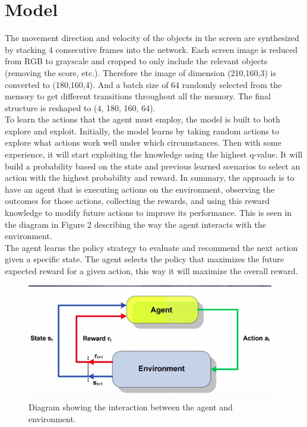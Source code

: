 \documentclass{article}
\begin{document}
\section{Model}
The movement direction and velocity of the objects in the screen are synthesized by stacking 4 consecutive frames into the network. Each screen image is reduced from RGB to grayscale and cropped to only include the relevant objects (removing the score, etc.). Therefore the image of dimension (210,160,3) is converted to (180,160,4). And a batch size of 64 randomly selected from the memory to get different transitions throughout all the memory. The final structure is reshaped to (4, 180, 160, 64). \\

To learn the actions that the agent must employ, the model is built to both explore and exploit. Initially, the model learns by taking random actions to explore what actions work well under which circumstances. Then with some experience, it will start exploiting the knowledge using the highest q-value. It will build a probability based on the state and previous learned scenarios to select an action with the highest probability and reward. In summary, the approach is to have an agent that is executing actions on the environment, observing the outcomes for those actions, collecting the rewards, and using this reward knowledge to modify future actions to improve its performance. This is seen in the diagram in Figure 2 describing the way the agent interacts with the environment. \\

The agent learns the policy strategy to evaluate and recommend the next action given a specific state. The agent selects the policy that maximizes the future expected reward for a given action, this way it will maximize the overall reward. 


\begin{figure}
    \centering
    \includegraphics[width=.7\textwidth]{Reinf_Graph.png}\hfill
    \caption{Diagram showing the interaction between the agent and environment.} 
\end{figure}
\end{document}
